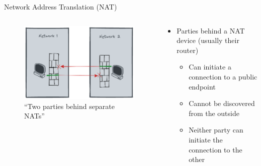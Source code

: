 \begin{frame}{Network Address Translation (NAT)}
\protect\hypertarget{network-address-translation-nat}{}
\begin{columns}[T]
\begin{column}{0.48\textwidth}
\begin{figure}
\centering
\includegraphics[width=\textwidth,height=0.66\textheight]{presentation/../figures/nat-intro.png}
\caption{``Two parties behind separate NATs''\label{nat-intro}}
\end{figure}
\end{column}

\begin{column}{0.48\textwidth}
\begin{itemize}
\tightlist
\item
  Parties behind a NAT device (usually their router)

  \begin{itemize}
  \tightlist
  \item
    Can initiate a connection to a public endpoint
  \item
    Cannot be discovered from the outside
  \item
    Neither party can initiate the connection to the other
  \end{itemize}
\end{itemize}
\end{column}
\end{columns}
\end{frame}


